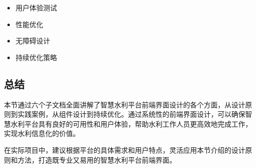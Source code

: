 \begin{enumerate}
  \begin{itemize}
  \tightlist
  \item
    用户体验测试
  \item
    性能优化
  \item
    无障碍设计
  \item
    持续优化策略
  \end{itemize}
\end{enumerate}

\subsection{总结}\label{ux603bux7ed3}

本节通过六个子文档全面讲解了智慧水利平台前端界面设计的各个方面，从设计原则到实践案例，从组件设计到持续优化。通过系统性的前端界面设计，可以确保智慧水利平台具有良好的可用性和用户体验，帮助水利工作人员更高效地完成工作，实现水利信息化的价值。

在实际项目中，建议根据平台的具体需求和用户特点，灵活应用本节介绍的设计原则和方法，打造既专业又易用的智慧水利平台前端界面。
